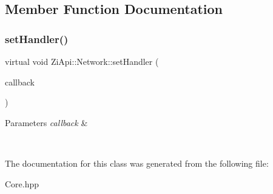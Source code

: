 \subsection{Member Function Documentation}
\mbox{\label{classZiApi_1_1Network_ab7ff3c88d60b8c7665a30886fd4cf473}} 
\subsubsection{\texorpdfstring{setHandler()}{setHandler()}}
{\footnotesize\ttfamily virtual void Zi\+Api\+::\+Network\+::set\+Handler (\begin{DoxyParamCaption}\item[{std\+::function$<$ void(std\+::unique\+\_\+ptr$<$ \mbox{\hyperlink{classZiApi_1_1HttpRequest}{Http\+Request}} $>$)$>$ \&\&}]{callback }\end{DoxyParamCaption})\hspace{0.3cm}{\ttfamily [pure virtual]}}


\begin{DoxyParams}{Parameters}
{\em callback} & 
\begin{DoxyCode}{1}
\DoxyCodeLine{\}}
\end{DoxyCode}
 \\
\hline
\end{DoxyParams}


The documentation for this class was generated from the following file\+:\begin{DoxyCompactItemize}
\item 
Core.\+hpp\end{DoxyCompactItemize}
